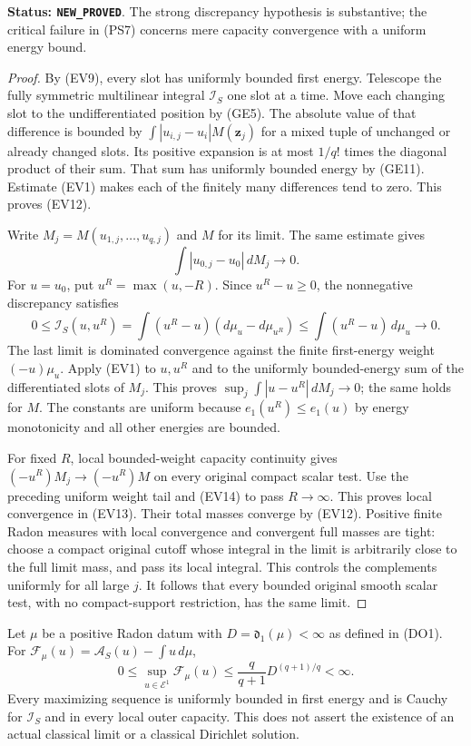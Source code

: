 \noindent\textbf{Status: \texttt{NEW\_PROVED}}. The
strong discrepancy hypothesis is substantive; the critical
failure in (PS7) concerns mere capacity convergence with
a uniform energy bound.

\begin{proof}
By (EV9), every slot has uniformly bounded first energy.
Telescope the fully symmetric multilinear integral
$\mathcal I_S$ one slot at a time. Move each changing
slot to the undifferentiated position by (GE5).
The absolute value of that difference is bounded by
$\int|u_{i,j}-u_i|M(\mathbf z_j)$ for a mixed tuple
of unchanged or already changed slots. Its positive
expansion is at most $1/q!$ times the diagonal product
of their sum. That sum has uniformly bounded energy by
(GE11). Estimate (EV1) makes each of the finitely many
differences tend to zero. This proves (EV12).

Write $M_j=M(u_{1,j},\ldots,u_{q,j})$ and $M$ for its
limit. The same estimate gives
\[
                  \int|u_{0,j}-u_0|\,dM_j\longrightarrow0.
 \tag{EV14}
\]
For $u=u_0$, put $u^R=\max(u,-R)$. Since $u^R-u\geq0$,
the nonnegative discrepancy satisfies
\[
 0\leq\mathscr I_S(u,u^R)
       =\int(u^R-u)(d\mu_u-d\mu_{u^R})
       \leq\int(u^R-u)\,d\mu_u\longrightarrow0.
 \tag{EV15}
\]
The last limit is dominated convergence against the finite
first-energy weight $(-u)\mu_u$.
Apply (EV1) to $u,u^R$ and to the uniformly bounded-energy
sum of the differentiated slots of $M_j$. This proves
$\sup_j\int|u-u^R|\,dM_j\to0$; the same holds for $M$.
The constants are uniform because $e_1(u^R)\leq e_1(u)$
by energy monotonicity and all other energies are bounded.

For fixed $R$, local bounded-weight capacity continuity
gives $(-u^R)M_j\to(-u^R)M$ on every original compact
scalar test. Use the preceding uniform weight tail and
(EV14) to pass $R\to\infty$. This proves local convergence
in (EV13). Their total masses converge by (EV12).
Positive finite Radon measures with local convergence
and convergent full masses are tight: choose a compact
original cutoff whose integral in the limit is arbitrarily
close to the full limit mass, and pass its local integral.
This controls the complements uniformly for all large $j$.
It follows that every bounded original smooth scalar test,
with no compact-support restriction, has the same limit.
\end{proof}

\begin{corollary}
\label{cor:r11-dual-maximizing-Cauchy}
Let $\mu$ be a positive Radon datum with
$D=\mathfrak d_1(\mu)<\infty$ as defined in (DO1).
For $\mathcal F_\mu(u)=\mathscr A_S(u)-\int u\,d\mu$,
\[
 0\leq\sup_{u\in\mathcal E^1}\mathcal F_\mu(u)
               \leq\frac q{q+1}D^{(q+1)/q}<\infty.
 \tag{EV16}
\]
Every maximizing sequence is uniformly bounded in first
energy and is Cauchy for $\mathscr I_S$ and in every local
outer capacity. This does not assert the existence of an
actual classical limit or a classical Dirichlet solution.
\end{corollary}

